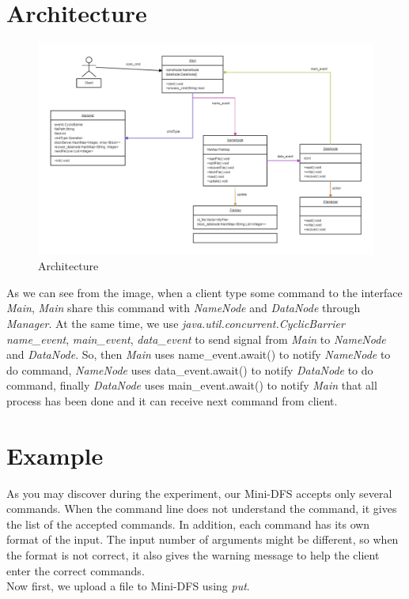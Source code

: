 \documentclass[10pt]{article}
\begin{document}
\section{Architecture}

\begin{figure}[H]
\centerline{\includegraphics[width = 1.5\textwidth]{screenshot//process.png}}
\caption{Architecture}
\label{fig_process}
\end{figure}

As we can see from the image, when a client type some command to the interface \textit{Main},
\textit{Main} share this command with \textit{NameNode} and \textit{DataNode} through \textit{Manager}.
 At the same time, we use \textit{java.util.concurrent.CyclicBarrier} \textit{name\_event},
 \textit{main\_event}, \textit{data\_event} to send signal from \textit{Main} to \textit{NameNode} and
 \textit{DataNode}. So, then \textit{Main} uses name\_event.await() to notify \textit{NameNode} to do command,
 \textit{NameNode} uses data\_event.await() to notify \textit{DataNode} to do command, finally \textit{DataNode}
 uses main\_event.await() to notify \textit{Main} that all process has been done and it can receive next command from client.

\section{Example}

As you may discover during the experiment, our Mini-DFS accepts only several commands. When the command line does not understand
the command, it gives the list of the accepted commands. In addition, each command has its own format of the input. The input number of
arguments might be different, so when the format is not correct, it also gives the warning message to help the client enter the correct commands.\\
Now first, we upload a file to Mini-DFS using \textit{put}.
\end{document}

